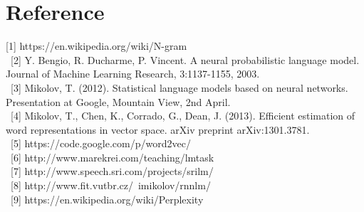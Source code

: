 \documentclass[11pt, oneside]{article}   	%
\begin{document}
\section{Reference}
[1] https://en.wikipedia.org/wiki/N-gram \\ \ 
[2] Y. Bengio, R. Ducharme, P. Vincent. A neural probabilistic language model. Journal of Machine Learning Research, 3:1137-1155, 2003.\\ \
[3] Mikolov, T. (2012). Statistical language models based on neural networks. Presentation at Google, Mountain View, 2nd April.\\ \
[4] Mikolov, T., Chen, K., Corrado, G.,  Dean, J. (2013). Efficient estimation of word representations in vector space. arXiv preprint arXiv:1301.3781.\\ \
[5] https://code.google.com/p/word2vec/\\ \
[6] http://www.marekrei.com/teaching/lmtask\\ \
[7] http://www.speech.sri.com/projects/srilm/\\ \
[8] http://www.fit.vutbr.cz/~imikolov/rnnlm/\\ \
[9] https://en.wikipedia.org/wiki/Perplexity\\ \
\end{document}

